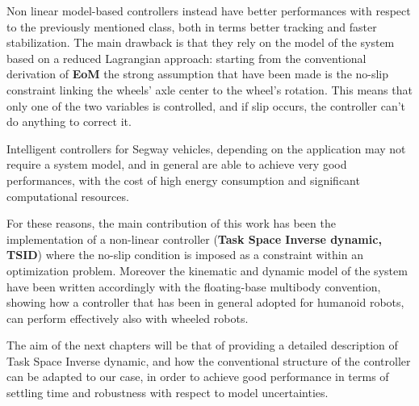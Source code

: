 Non linear model-based controllers instead have better performances with respect to the previously mentioned class, both in terms better tracking and faster stabilization. The main drawback is that they rely on the model of the system based on a reduced Lagrangian approach: starting from the conventional derivation of \textbf{EoM} the strong assumption that have been made is the no-slip constraint linking the wheels' axle center to the wheel's rotation.
This means that only one of the two variables is controlled, and if slip occurs, the controller can't do anything to correct it.

Intelligent controllers for Segway vehicles, depending on the application may not require a system model, and in general are able to achieve very good performances, with the cost of high energy consumption and significant computational resources.

For these reasons, the main contribution of this work has been the implementation of a non-linear controller (\textbf{Task Space Inverse dynamic, TSID}) where the no-slip condition is imposed as a constraint within an optimization problem.
Moreover the kinematic and dynamic model of the system have been written accordingly with the floating-base multibody convention, showing how a controller that has been in general adopted for humanoid robots, can perform effectively also with wheeled robots.

The aim of the next chapters will be that of providing a detailed description of Task Space Inverse dynamic, and how the conventional structure of the controller can be adapted to our case, in order to achieve good performance in terms of settling time and robustness with respect to model uncertainties.

\clearpage
\blankpage